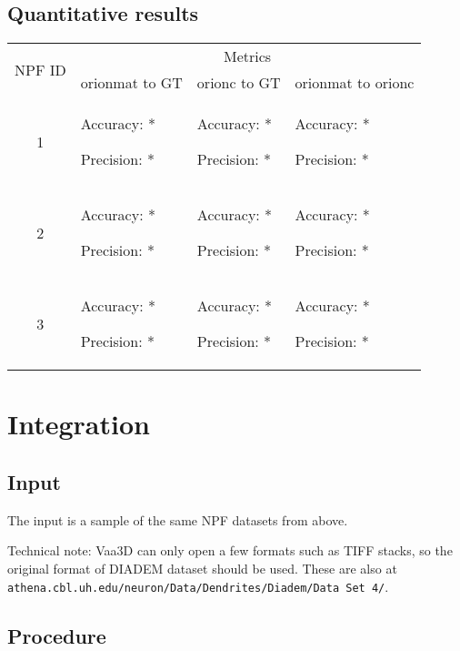 \documentclass[12pt]{article}
\begin{document}
\subsection{Quantitative results}

\begin{tabular}{|c|p{}|p{}|p{}|}
	\hline
	\multirow{2}{*}{\be NPF ID } & \multicolumn{3}{c|}{\be Metrics} \\\cline{2-4}
				  & \multicolumn{1}{c|}{\be \gls{orionmat} to GT} & \multicolumn{1}{c|}{\be \gls{orionc} to GT} & \multicolumn{1}{c|}{\be \gls{orionmat} to \gls{orionc}} \\\hline
		1  & Accuracy: * \par Precision: * & Accuracy: * \par Precision: * & Accuracy: * \par Precision: * \\\hline
		2  & Accuracy: * \par Precision: * & Accuracy: * \par Precision: * & Accuracy: * \par Precision: * \\\hline
		3  & Accuracy: * \par Precision: * & Accuracy: * \par Precision: * & Accuracy: * \par Precision: * \\\hline
\end{tabular}

\section{Integration}

\subsection{Input}

The input is a sample of the same NPF datasets from above.

Technical note: Vaa3D can only open a few formats such as TIFF stacks, so the
original format of DIADEM dataset should be used. These are also at
\nolinkurl{athena.cbl.uh.edu/neuron/Data/Dendrites/Diadem/Data Set 4/}.

\subsection{Procedure}
\end{document}
